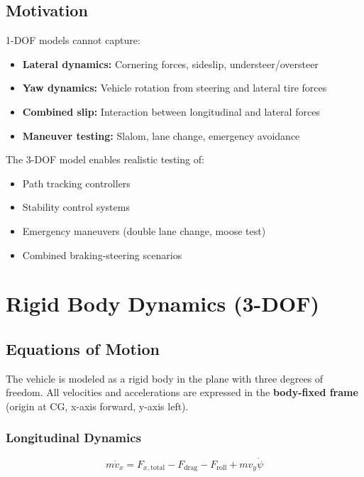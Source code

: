 \documentclass[11pt,a4paper]{article}
\begin{document}
\subsection{Motivation}

1-DOF models cannot capture:
\begin{itemize}
    \item \textbf{Lateral dynamics:} Cornering forces, sideslip, understeer/oversteer
    \item \textbf{Yaw dynamics:} Vehicle rotation from steering and lateral tire forces
    \item \textbf{Combined slip:} Interaction between longitudinal and lateral forces
    \item \textbf{Maneuver testing:} Slalom, lane change, emergency avoidance
\end{itemize}

The 3-DOF model enables realistic testing of:
\begin{itemize}
    \item Path tracking controllers
    \item Stability control systems
    \item Emergency maneuvers (double lane change, moose test)
    \item Combined braking-steering scenarios
\end{itemize}

\section{Rigid Body Dynamics (3-DOF)}

\subsection{Equations of Motion}

The vehicle is modeled as a rigid body in the plane with three degrees of freedom. All velocities and accelerations are expressed in the \textbf{body-fixed frame} (origin at CG, x-axis forward, y-axis left).

\subsubsection{Longitudinal Dynamics}

\begin{equation}
m \dot{v}_x = F_{x,\text{total}} - F_{\text{drag}} - F_{\text{roll}} + m v_y \dot{\psi}
\label{eq:long_dynamics}
\end{equation}
\end{document}
